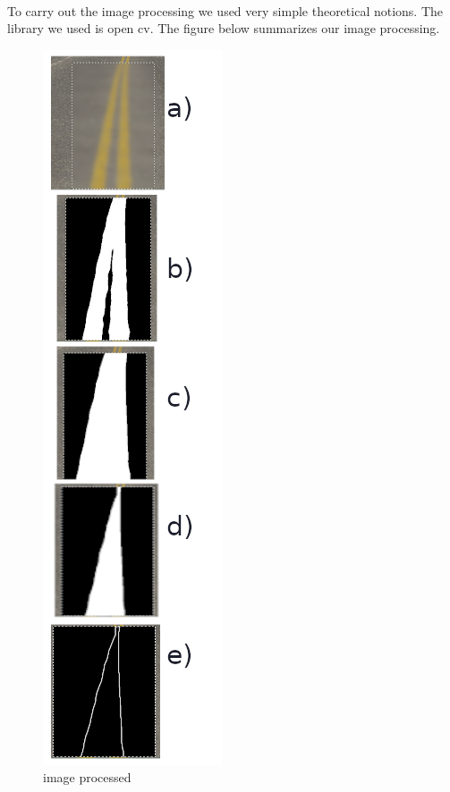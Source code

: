 


\paragraph{}
To carry out the image processing we used very simple theoretical notions. The library we used is open cv. The figure below summarizes our image processing.
\begin{figure}[ht!]
    \begin{center}
        \includegraphics[scale=0.3]{Images/diagramme.png}
    \end{center}
    \caption{image processed}
    \label{fig:img_processing}
\end{figure}

